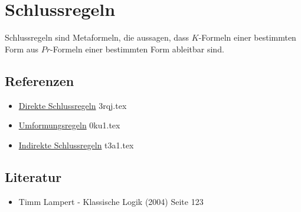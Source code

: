 \documentclass{sajzk}
\begin{document}
\section{Schlussregeln}
\label{wd5l}
Schlussregeln sind Metaformeln, die aussagen, dass $K$-Formeln einer bestimmten
Form aus $Pr$-Formeln einer bestimmten Form ableitbar sind.

\subsection{Referenzen}
\begin{itemize}
    \item \href{3rqj.pdf}{Direkte Schlussregeln} 3rqj.tex
    \item \href{0ku1.pdf}{Umformungsregeln} 0ku1.tex
    \item \href{t3a1.pdf}{Indirekte Schlussregeln} t3a1.tex
\end{itemize}

\subsection{Literatur}
\begin{itemize}
    \item Timm Lampert - Klassische Logik (2004) Seite 123
\end{itemize}
\end{document}
